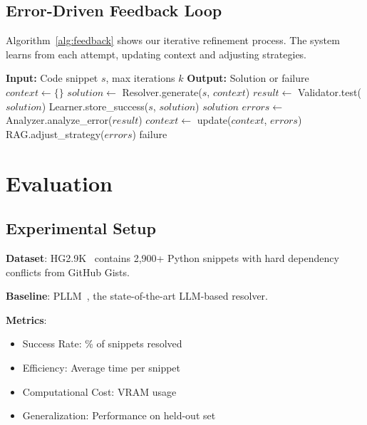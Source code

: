 \documentclass[sigconf]{acmart}
\begin{document}
\subsection{Error-Driven Feedback Loop}

Algorithm~\ref{alg:feedback} shows our iterative refinement process. The system learns from each attempt, updating context and adjusting strategies.

\begin{algorithm}
\caption{Error-Driven Feedback Loop}
\label{alg:feedback}
\begin{algorithmic}[1]
\STATE \textbf{Input:} Code snippet $s$, max iterations $k$
\STATE \textbf{Output:} Solution or failure
\STATE $context \leftarrow \{\}$
    \STATE $solution \leftarrow$ Resolver.generate($s$, $context$)
    \STATE $result \leftarrow$ Validator.test($solution$)
        \STATE Learner.store\_success($s$, $solution$)
        \RETURN $solution$
    \ELSE
        \STATE $errors \leftarrow$ Analyzer.analyze\_error($result$)
        \STATE $context \leftarrow$ update($context$, $errors$)
        \STATE RAG.adjust\_strategy($errors$)
    \ENDIF
\ENDFOR
\RETURN failure
\end{algorithmic}
\end{algorithm}

\section{Evaluation}

\subsection{Experimental Setup}

\textbf{Dataset}: HG2.9K~\cite{horton2018} contains 2,900+ Python snippets with hard dependency conflicts from GitHub Gists.

\textbf{Baseline}: PLLM~\cite{bartlett2025}, the state-of-the-art LLM-based resolver.

\textbf{Metrics}:
\begin{itemize}
\item Success Rate: \% of snippets resolved
\item Efficiency: Average time per snippet
\item Computational Cost: VRAM usage
\item Generalization: Performance on held-out set
\end{itemize}
\end{document}
